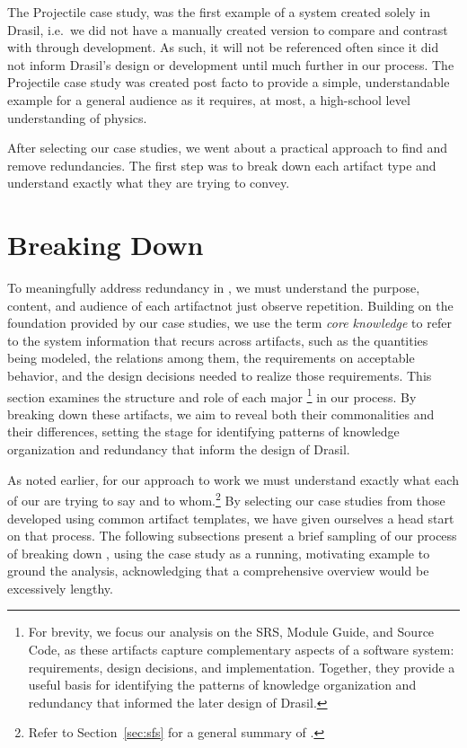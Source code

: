 The Projectile case study, was the first example of a system 
created solely in Drasil, i.e.\ we did not have a manually created version to 
compare and contrast with through development. As such, it will not be 
referenced often since it did not inform Drasil's design or development until 
much further in our process. The Projectile case study was created post facto
to provide a simple, understandable example for a general audience as it 
requires, at most, a high-school level understanding of physics. 

After selecting our case studies, we went about a practical approach
to find and remove redundancies. The first step was to break down each artifact
type and understand exactly what they are trying to convey.


\section{Breaking Down \SFS{}}
\label{sec:breakdown}

To meaningfully address redundancy in \sfs{}, we must understand 
the purpose, content, and audience of each artifact\textemdash{}not just 
observe repetition. Building on the foundation provided by our case studies, 
we use the term \emph{core knowledge} to refer to the system information that 
recurs across artifacts, such as the quantities being modeled, the relations 
among them, the requirements on acceptable behavior, and the design decisions 
needed to realize those requirements. This section examines the structure and 
role of each major \sf{}\footnote{For 
brevity, we focus our analysis on the SRS, Module Guide, and Source Code, as 
these artifacts capture complementary aspects of a software system: 
requirements, design decisions, and implementation. Together, they provide a 
useful basis for identifying the patterns of knowledge organization and 
redundancy that informed the later design of Drasil.} 
in our process. By breaking down these artifacts, we aim to reveal both their 
commonalities and their differences, setting the stage for identifying patterns 
of knowledge organization and redundancy that inform the design of Drasil.

As noted earlier, for our approach to work we must understand exactly what each
of our \sfs{} are trying to say and to whom.\footnote{Refer to 
Section~\ref{sec:sfs} for a general summary of \sfs{}.} By selecting our case 
studies from those developed using common artifact templates, we have given 
ourselves a head start on that process. The following subsections present a 
brief sampling of our process of breaking down \sfs{}, using the \gb{} case 
study as a running, motivating example to ground the analysis, acknowledging 
that a comprehensive overview would be excessively lengthy.

